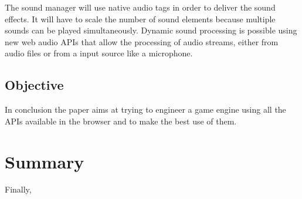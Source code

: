 The sound manager will use native audio tags in order to deliver the sound effects. It will have to scale the number of sound elements because multiple sounds can be played
simultaneously. Dynamic sound processing is possible using new web audio APIs that
allow the processing of audio streams, either from audio files or from a input source like a microphone.

\subsection{Objective}
\label{sub-sec:proj-desc-objective}

In conclusion the paper aims at trying to engineer a game engine using all the APIs
available in the browser and to make the best use of them.


\section{Summary}
\label{sec:summary}





Finally,  
